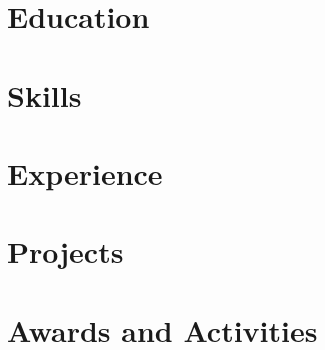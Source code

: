 \documentclass[letter,10pt]{article}
\begin{document}
%
\section{Education}


\section{Skills}


\section{Experience}



\section{Projects}


\section{Awards and Activities}

\end{document}
